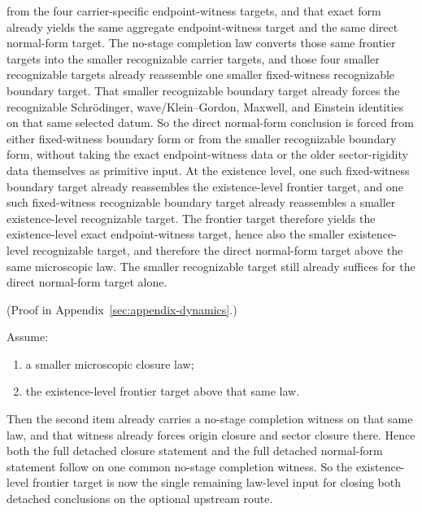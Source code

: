 \begin{theorem}
from the four carrier-specific endpoint-witness targets, and that exact form
already yields the same aggregate endpoint-witness target and the same direct
normal-form target. The no-stage completion law converts those same frontier
targets into the smaller recognizable carrier targets, and those four smaller
recognizable targets already reassemble one smaller fixed-witness recognizable
boundary target. That smaller recognizable boundary target already forces the
recognizable Schr\"odinger, wave/Klein--Gordon, Maxwell, and Einstein
identities on that same selected datum. So the direct normal-form conclusion
is forced from either fixed-witness boundary form or from the smaller
recognizable boundary form, without taking the exact endpoint-witness data or
the older sector-rigidity data themselves as primitive input. At the
existence level, one such fixed-witness boundary target already reassembles
the existence-level frontier target, and one such fixed-witness recognizable
boundary target already reassembles a smaller
existence-level recognizable target. The frontier target therefore yields the
existence-level exact endpoint-witness target, hence also the smaller
existence-level recognizable target, and therefore the direct normal-form
target above the same microscopic law. The smaller recognizable target still
already suffices for the direct normal-form target alone.
\end{theorem}

(Proof in Appendix~\ref{sec:appendix-dynamics}.)

\begin{corollary}
\label{cor:frontier-target-closes-the-full-detached-capstone}
Assume:
\begin{enumerate}
\item a smaller microscopic closure law;
\item the existence-level frontier target above that same law.
\end{enumerate}
Then the second item already carries a no-stage completion witness on that same
law, and that witness already forces origin closure and sector closure there.
Hence both the full detached closure statement and the full detached
normal-form statement follow on one common no-stage completion witness. So the
existence-level frontier target is now the single remaining law-level input for
closing both detached conclusions on the optional upstream route.
\end{corollary}

